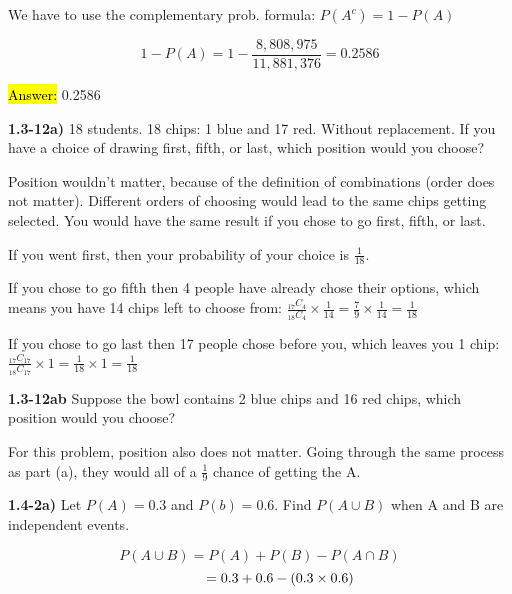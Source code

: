 \documentclass{article}
\begin{document}
We have to use the complementary prob. formula: $P(A^{c})=1-P(A)$

$$1-P(A)=1-\frac{8,808,975}{11,881,376} = 0.2586$$

 \hl{Answer:} 0.2586
 
 
\newpage

\textbf{1.3-12a)} 18 students. 18 chips: 1 blue and 17 red. Without replacement. If you have a choice of drawing first, fifth, or last, which position would you choose?

\vspace{2mm}
Position wouldn't matter, because of the definition of combinations (order does not matter). Different orders of choosing would lead to the same chips getting selected. You would have the same result if you chose to go first, fifth, or last.
\vspace{2mm}


If you went first, then your probability of your choice is $\frac{1}{18}$. 
\vspace{2mm}

If you chose to go fifth then 4 people have already chose their options, which means you have 14 chips left to choose from: $\frac{_{17}C_{4}}{_{18}C_{4}}\times \frac{1}{14}=\frac{7}{9}\times\frac{1}{14}=\frac{1}{18}$

\vspace{2mm}
If you chose to go last then 17 people chose before you, which leaves you 1 chip: $\frac{_{17}C_{17}}{_{18}C_{17}}\times 1 =\frac{1}{18}\times1=\frac{1}{18}$

\vspace{2mm}


 \vspace{5mm}
\textbf{1.3-12ab} Suppose the bowl contains 2 blue chips and 16 red chips, which position would you choose? 

 \vspace{2mm}
For this problem, position also does not matter. Going through the same process as part (a), they would all of a $\frac{1}{9}$ chance of getting the A. 



\newpage

\textbf{1.4-2a)} Let $ P(A) =0.3$ and $P(b)=0.6.$ Find $P(A\cup B)$ when A and B are independent events. 

$$P(A\cup B)=P(A)+P(B)-P(A\cap B)$$
$$\hspace{.4in}=0.3+0.6-(0.3\times 0.6)$$
\end{document}
